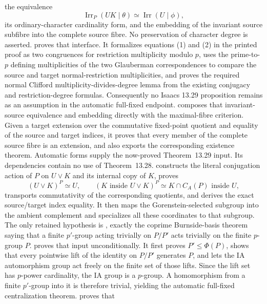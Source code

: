 \documentclass[11pt]{article}
\newcommand{\Irr}{\operatorname{Irr}}
\begin{document}
the equivalence
\[
  \Irr_P(UK\mid\theta)\simeq\Irr(U\mid\phi),
\]
its ordinary-character cardinality form, and the embedding of the
invariant source subfibre into the complete source fibre.  No preservation
of character degree is asserted.
 proves that
interface.  It formalizes equations (1) and (2) in the printed proof as
two congruences for restriction multiplicity modulo \(p\), uses the
prime-to-\(p\) defining multiplicities of the two Glauberman
correspondences to compare the source and target normal-restriction
multiplicities, and proves the required normal Clifford
multiplicity-divides-degree lemma from the existing conjugacy and
restriction-degree formulas.  Consequently no Isaacs 13.29 proposition
remains as an assumption in the automatic full-fixed endpoint.
 composes that
invariant-source equivalence and embedding directly with the
maximal-fibre criterion.  Given a target extension over the commutative
fixed-point quotient and equality of the source and target indices, it
proves that every member of the complete source fibre is an extension,
and also exports the corresponding existence theorem.  Automatic forms
supply the now-proved Theorem~13.29 input.  Its dependencies contain no
use of Theorem~13.28.
 constructs the
literal conjugation action of \(P\) on \(U\vee K\) and its internal copy of
\(K\), proves
\[
  (U\vee K)^P\simeq U,\qquad
  (K\text{ inside }U\vee K)^P\simeq K\cap C_A(P)\text{ inside }U,
\]
transports commutativity of the corresponding quotients, and derives the
exact source/target index equality.  It then maps the Gorenstein-selected
subgroup into the ambient complement and specializes all these coordinates
to that subgroup.  The only retained hypothesis is
, exactly the coprime
Burnside-basis theorem saying that a finite \(p'\)-group acting trivially
on \(P/P'\) acts trivially on the finite \(p\)-group \(P\).
 proves that
input unconditionally.  It first proves \(P'\leq\Phi(P)\), shows that
every pointwise lift of the identity on \(P/P'\) generates \(P\), and
lets the IA automorphism group act freely on the finite set of those
lifts.  Since the lift set has \(p\)-power cardinality, the IA group is a
\(p\)-group.  A homomorphism from a finite \(p'\)-group into it is
therefore trivial, yielding the automatic full-fixed centralization
theorem.
 proves that
\end{document}
